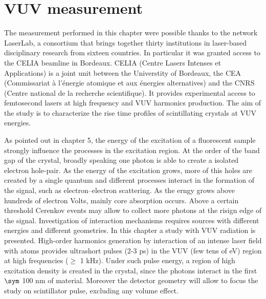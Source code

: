 
\chapter{VUV measurement}
The measurement performed in this chapter were possible thanks to the network LaserLab, a consortium that brings together thirty institutions in laser-based disciplinary research from sixteen countries. In particular it was granted access to the CELIA beamline in Bordeaux.
CELIA (Centre Lasers Intenses et Applications) is a joint unit between the Universtity of Bordeaux, the CEA (Commissariat à l'énergie atomique et aux énergies alternatives) and the CNRS (Centre national de la recherche scientifique). It provides experimental access to femtosecond lasers at high frequency and VUV harmonics production.
The aim of the study is to characterize the rise time profiles of scintillating crystals at VUV energies.

As pointed out in chapter 5, the energy of the excitation of a fluorescent sample strongly influence the processes in the excitation region.
At the order of the band gap of the crystal, broadly speaking one photon is able to create a isolated electron hole-pair. As the energy of the excitation grows, more of this holes are created by a single quantum and different processes interact in the formation of the signal, such as electron–electron scattering.
As the erngy grows above hundreds of electron Volts, mainly core absorption occurs. 
Above a certain threshold Cerenkov events may allow to collect more photons at the risign edge of the signal. 
Investigation of interaction mechanisms requires sources with different energies and different geometries.
In this chapter a study with VUV radiation is presented. High-order harmonics generation by interaction of an intense laser field with atoms provides ultrashort pulses (2-3 ps) in the VUV (few tens of eV) region at high frequencies ($\geq$ 1 kHz). 
Under such pulse energy, a region of high excitation density is created in the crystal, since the photons interact in the first $\sym$ 100 nm of material.
Moreover the detector geometry will allow to focus the study on scintillator pulse, excluding any volume effect.

